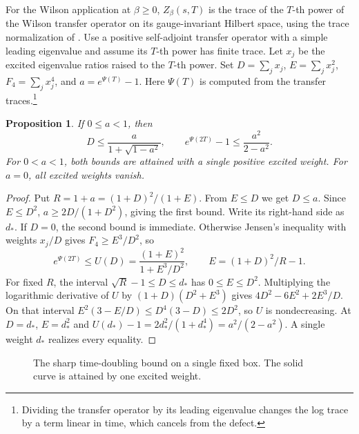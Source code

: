 \documentclass[11pt]{amsart}
\newtheorem{proposition}[theorem]{Proposition}
\begin{document}
For the Wilson application at \(\beta\ge0\), \(Z_\beta(s,T)\) is the
trace of the \(T\)-th power of the Wilson transfer operator on its
gauge-invariant Hilbert space, using the trace normalization of
\cite[Lemma 7.3]{OneScale}. Use a positive self-adjoint transfer operator
with a simple leading eigenvalue and assume its \(T\)-th power has finite
trace. Let \(x_j\) be the excited eigenvalue
ratios raised to the \(T\)-th power. Set \(D=\sum_jx_j\),
\(E=\sum_jx_j^2\), \(F_4=\sum_jx_j^4\), and \(a=e^{\Psi(T)}-1\).
Here \(\Psi(T)\) is computed from the transfer traces.\footnote{Dividing
 the transfer operator by its leading eigenvalue changes the log trace
 by a term linear in time, which cancels from the defect.}

\begin{proposition}
If \(0\le a<1\), then
\[
 D\le\frac{a}{1+\sqrt{1-a^2}},\qquad
 e^{\Psi(2T)}-1\le\frac{a^2}{2-a^2}.
\]
For \(0<a<1\), both bounds are attained with a single positive excited
weight. For \(a=0\), all excited weights vanish.
\end{proposition}

\begin{proof}
Put \(R=1+a=(1+D)^2/(1+E)\). From \(E\le D\) we get \(D\le a\).
Since \(E\le D^2\), \(a\ge2D/(1+D^2)\), giving the first bound. Write its
right-hand side as \(d_*\). If \(D=0\), the second bound is immediate.
Otherwise Jensen's inequality with weights \(x_j/D\) gives
\(F_4\ge E^3/D^2\), so
\[
 e^{\Psi(2T)}\le U(D)=\frac{(1+E)^2}{1+E^3/D^2},
 \qquad E=(1+D)^2/R-1.
\]
For fixed \(R\), the interval \(\sqrt R-1\le D\le d_*\) has
\(0\le E\le D^2\). Multiplying the logarithmic derivative of \(U\) by
\((1+D)(D^2+E^3)\) gives \(4D^2-6E^2+2E^3/D\).
On that interval \(E^2(3-E/D)\le D^4(3-D)\le2D^2\), so
\(U\) is nondecreasing. At \(D=d_*\), \(E=d_*^2\) and
\(U(d_*)-1=2d_*^2/(1+d_*^4)=a^2/(2-a^2)\). A single weight \(d_*\)
realizes every equality.
\end{proof}

\begin{figure}[ht]
\centering
{}
\caption{The sharp time-doubling bound on a single fixed box. The solid
curve is attained by one excited weight.}
\label{fig:contraction}
\end{figure}
\end{document}
